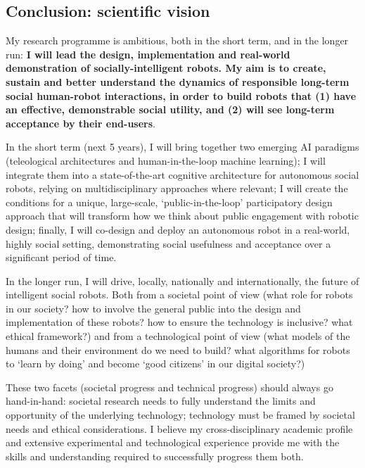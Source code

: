 \subsection{Conclusion: scientific vision}

My research programme is ambitious, both in the short term, and in the longer
run: \textbf{I will lead the design, implementation and real-world demonstration
of socially-intelligent robots. My aim is to create, sustain and better
understand the dynamics of responsible long-term social human-robot
interactions, in order to build robots that (1) have an effective, demonstrable
social utility, and (2) will see long-term acceptance by their end-users}.


In the short term (next 5 years), I will bring together two emerging AI
paradigms (teleological architectures and human-in-the-loop machine learning); I
will integrate them into a state-of-the-art cognitive architecture for
autonomous social robots, relying on multidisciplinary approaches where
relevant; I will create the conditions for a unique, large-scale,
`public-in-the-loop' participatory design approach that will transform how we
think about public engagement with robotic design; finally, I will co-design
and deploy an autonomous robot in a real-world, highly social setting,
demonstrating social usefulness and acceptance over a significant period of
time.

In the longer run, I will drive, locally, nationally and internationally, the
future of intelligent social robots. Both from a societal point of view (what
role for robots in our society? how to involve the general public into the
design and implementation of these robots?  how to ensure the technology is
inclusive? what ethical framework?) and from a technological point of view (what
models of the humans and their environment do we need to build? what algorithms
for robots to `learn by doing' and become `good citizens' in our digital
society?)

These two facets (societal progress and technical progress) should always go
hand-in-hand: societal research needs to fully understand the limits and
opportunity of the underlying technology; technology must be framed
by societal needs and ethical considerations. I believe my cross-disciplinary
academic profile and extensive experimental and technological experience provide me
with the skills and understanding required to successfully progress them both.

